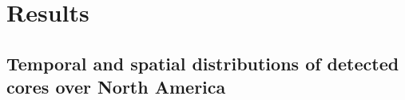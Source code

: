 


\section{Results}


\subsection{Temporal and spatial distributions of detected cores over North America}


